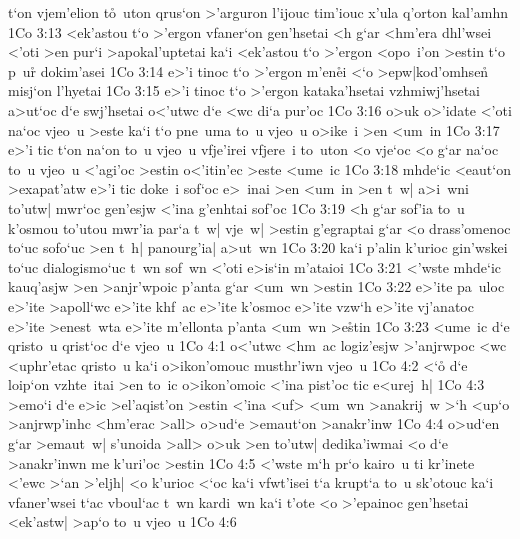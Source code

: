 t`on
vjem'elion
t\r{o}~uton
qrus`on
>'arguron
l'ijouc
tim'iouc
x'ula
q'orton
kal'amhn\bibvsend
\vs 1Co 3:13
<ek'astou
t`o
>'ergon
vfaner`on
gen'hsetai
<h
g`ar
<hm'era
dhl'wsei
<'oti
>en
pur`i
>apokal'uptetai
ka`i
<ek'astou
t`o
>'ergon
<opo~i'on
>estin
t`o
p~u\r{r}
dokim'asei\bibvsend
\vs 1Co 3:14
e>'i
tinoc
t`o
>'ergon
m'en\r{e}i
<`o
>epw|kod'omhsen\r{}
misj`on
l'hyetai\bibvsend
\vs 1Co 3:15
e>'i
tinoc
t`o
>'ergon
kataka'hsetai
vzhmiwj'hsetai
a>ut`oc
d`e
swj'hsetai
o<'utwc
d`e
<wc
di`a
pur'oc\bibvsend
\vs 1Co 3:16
o>uk
o>'idate
<'oti
na`oc
vjeo~u
>este
ka`i
t`o
pne~uma
to~u
vjeo~u
o>ike~i
>en
<um~in\bibvsend
\vs 1Co 3:17
e>'i
tic
t`on
na`on
to~u
vjeo~u
vfje'irei
vfjere~i
to~uton
<o
vje`oc
<o
g`ar
na`oc
to~u
vjeo~u
<'agi'oc
>estin
o<'itin'ec
>este
<ume~ic\bibvsend
\vs 1Co 3:18
mhde`ic
<eaut`on
>exapat'atw
e>'i
tic
doke~i
sof`oc
e>~inai
>en
<um~in
>en
t~w|
a>i~wni
to'utw|
mwr`oc
gen'esjw
<'ina
g'enhtai
sof'oc\bibvsend
\vs 1Co 3:19
<h
g`ar
sof'ia
to~u
k'osmou
to'utou
mwr'ia
par`a
t~w|
vje~w|
>estin
g'egraptai
g`ar
<o
drass'omenoc
to`uc
sofo`uc
>en
t~h|
panourg'ia|
a>ut~wn\bibvsend
\vs 1Co 3:20
ka`i
p'alin
k'urioc
gin'wskei
to`uc
dialogismo`uc
t~wn
sof~wn
<'oti
e>is`in
m'ataioi\bibvsend
\vs 1Co 3:21
<'wste
mhde`ic
kauq'asjw
>en
>anjr'wpoic
p'anta
g`ar
<um~wn
>estin\bibvsend
\vs 1Co 3:22
e>'ite
pa~uloc
e>'ite
>apoll`wc
e>'ite
khf~ac
e>'ite
k'osmoc
e>'ite
vzw`h
e>'ite
vj'anatoc
e>'ite
>enest~wta
e>'ite
m'ellonta
p'anta
<um~wn
>e\r{s}tin\bibvsend
{}
\vs 1Co 3:23
<ume~ic
d`e
qristo~u
qrist`oc
d`e
vjeo~u\bibvsend
\vs 1Co 4:1
o<'utwc
<hm~ac
logiz'esjw
>'anjrwpoc
<wc
<uphr'etac
qristo~u
ka`i
o>ikon'omouc
musthr'iwn
vjeo~u\bibvsend
\vs 1Co 4:2
<`o\r{}
d`e
loip`on
vzhte~itai
>en
to~ic
o>ikon'omoic
<'ina
pist'oc
tic
e<urej~h|\bibvsend
\vs 1Co 4:3
>emo`i
d`e
e>ic
>el'aqist'on
>estin
<'ina
<uf>
<um~wn
>anakrij~w
>`h
<up`o
>anjrwp'inhc
<hm'erac
>all>
o>ud`e
>emaut`on
>anakr'inw\bibvsend
\vs 1Co 4:4
o>ud`en
g`ar
>emaut~w|
s'unoida
>all>
o>uk
>en
to'utw|
dedika'iwmai
<o
d`e
>anakr'inwn
me
k'uri'oc
>estin\bibvsend
\vs 1Co 4:5
<'wste
m`h
pr`o
kairo~u
ti
kr'inete
<'ewc
>`an
>'eljh|
<o
k'urioc
<`oc
ka`i
vfwt'isei
t`a
krupt`a
to~u
sk'otouc
ka`i
vfaner'wsei
t`ac
vboul`ac
t~wn
kardi~wn
ka`i
t'ote
<o
>'epainoc
gen'hsetai
<ek'astw|
>ap`o
to~u
vjeo~u\bibvsend
\vs 1Co 4:6
